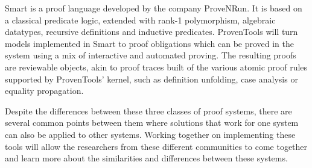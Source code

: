 \begin{description}
  Smart is a proof language developed by the company ProveNRun. It is
  based on a classical predicate logic, extended with rank-1
  polymorphism, algebraic datatypes, recursive definitions and
  inductive predicates. ProvenTools will turn models implemented in
  Smart to proof obligations which can be proved in the system using a
  mix of interactive and automated proving. The resulting proofs are
  reviewable objects, akin to proof traces built of the various atomic
  proof rules supported by ProvenTools' kernel, such as definition
  unfolding, case analysis or equality propagation.
\end{description}

Despite the differences between these three classes of proof systems,
there are several common points between them where solutions that work
for one system can also be applied to other systems. Working together
on implementing these tools will allow the researchers from these
different communities to come together and learn more about the
similarities and differences between these systems.

